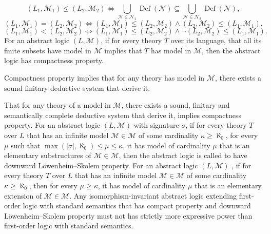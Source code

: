 \documentclass[a4paper,12pt]{article}
\begin{document}
\[(L_1,\mathscr{M}_1)\leq(L_2,\mathscr{M}_2)\iff\bigcup_{\mathcal{N}\in\mathscr{N}_1}\operatorname{Def}(\mathcal{N})\subseteq\bigcup_{\mathcal{N}\in\mathscr{N}_2}\operatorname{Def}(\mathcal{N}),\]
\[(L_1,\mathscr{M}_1)=(L_2,\mathscr{M}_2)\iff(L_1,\mathscr{M}_1)\leq(L_2,\mathscr{M}_2)\land(L_2,\mathscr{M}_2)\leq(L_1,\mathscr{M}_1).\]
\[(L_1,\mathscr{M}_1)<(L_2,\mathscr{M}_2)\iff(L_1,\mathscr{M}_1)\leq(L_2,\mathscr{M}_2)\land\neg(L_2,\mathscr{M}_2)\leq(L_1,\mathscr{M}_1).\]
For an abstract logic $(L,\mathscr{M})$, if for every theory $T$ over its language, that all its finite subsets have model in $\mathscr{M}$ implies that $T$ has model in $\mathscr{M}$, then the abstract logic has compactness property.

Compactness property implies that for any theory has model in $\mathscr{M}$, there exists a sound finitary deductive system that derive it.

That for any theory of a model in $\mathscr{M}$, there exists a sound, finitary and semantically complete deductive system that derive it, implies compactness property.
For an abstract logic $(L,\mathscr{M})$ with signature $\sigma$, if for every theory $T$ over $L$ that has an infinite model $\mathcal{M}\in\mathscr{M}$ of some cardinality $\kappa\geq\aleph_0$, for every $\mu$ such that $\max(|\sigma|,\aleph_0)\leq\mu\leq\kappa$, it has model of cardinality $\mu$ that is an elementary substructures of $\mathcal{M}\in\mathscr{M}$, then the abstract logic is called to have downward Löwenheim–Skolem property.
For an abstract logic $(L,\mathscr{M})$ , if for every theory $T$ over $L$ that has an infinite model $\mathcal{M}\in\mathscr{M}$ of some cardinality $\kappa\geq\aleph_0$, then for every $\mu\geq\kappa$, it has model of cardinality $\mu$ that is an elementary extension of $\mathcal{M}\in\mathscr{M}$.
Any isomorphism-invariant abstract logic extending first-order logic with standard semantics that has compact property and downward Löwenheim–Skolem property must not has strictly more expressive power than first-order logic with standard semantics.
\end{document}
